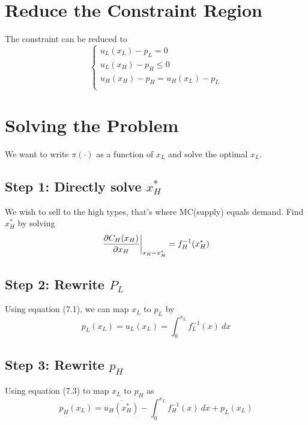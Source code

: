 \documentclass[11pt]{article}
\begin{document}
	\section{Reduce the Constraint Region}
	The constraint can be reduced to
	\begin{equation}
		\begin{cases}
			u_L(x_L) - p_L = 0 \\
			u_L(x_H) - p_H \leq 0 \\
			u_H(x_H) - p_H = u_H(x_L) - p_L \\
		\end{cases}
	\end{equation}
	
	\section{Solving the Problem}
		We want to write $\pi(\cdot)$ as a function of $x_L$ and solve the optimal $x_L$.
	\subsection{Step 1: Directly solve $x_H^*$}
		We wish to sell  to the high types, that's where MC(supply) equals demand.
		Find $x_H^*$ by solving
		\begin{equation}
			\frac{\partial{C_H(x_H)}}{\partial{x_H}}\bigg\vert_{x_H = x_H^*} = f_H^{-1}(x_H^*)
		\end{equation}
	\subsection{Step 2: Rewrite $P_L$}
		Using equation (7.1), we can map $x_L$ to $p_L$ by
		\begin{equation}
			p_L(x_L) = u_L(x_L) = \int_0^{x_L} f_L^{-1}(x)\ dx
		\end{equation}
	\subsection{Step 3: Rewrite $p_H$}
		Using equation (7.3) to map $x_L$ to $p_H$ as
		\begin{equation}
			p_H(x_L) = \overline{u_H(x_H^*)} - \int_{0}^{x_L}f_H^{-1}(x)\ dx + p_L(x_L)
		\end{equation}
\end{document}
